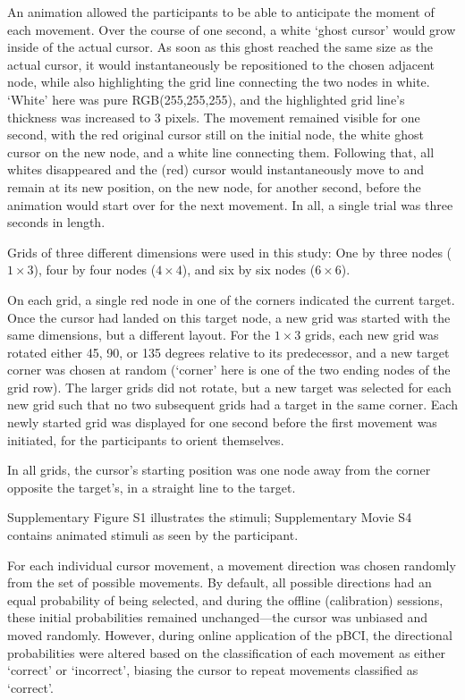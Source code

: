 An animation allowed the participants to be able to anticipate the moment of each movement. Over the course of one second, a white `ghost cursor' would grow inside of the actual cursor. As soon as this ghost reached the same size as the actual cursor, it would instantaneously be repositioned to the chosen adjacent node, while also highlighting the grid line connecting the two nodes in white. `White' here was pure \textsc{RGB}(255,255,255), and the highlighted grid line's thickness was increased to 3 pixels. The movement remained visible for one second, with the red original cursor still on the initial node, the white ghost cursor on the new node, and a white line connecting them. Following that, all whites disappeared and the (red) cursor would instantaneously move to and remain at its new position, on the new node, for another second, before the animation would start over for the next movement. In all, a single trial was three seconds in length.

Grids of three different dimensions were used in this study: One by three nodes ($1\times3$), four by four nodes ($4\times4$), and six by six nodes ($6\times6$).

On each grid, a single red node in one of the corners indicated the current target. Once the cursor had landed on this target node, a new grid was started with the same dimensions, but a different layout. For the $1\times3$ grids, each new grid was rotated either 45, 90, or 135 degrees relative to its predecessor, and a new target corner was chosen at random (`corner' here is one of the two ending nodes of the grid row). The larger grids did not rotate, but a new target was selected for each new grid such that no two subsequent grids had a target in the same corner. Each newly started grid was displayed for one second before the first movement was initiated, for the participants to orient themselves.

In all grids, the cursor's starting position was one node away from the corner opposite the target's, in a straight line to the target. 

Supplementary Figure S1 illustrates the stimuli; Supplementary Movie S4 contains animated stimuli as seen by the participant.

For each individual cursor movement, a movement direction was chosen randomly from the set of possible movements. By default, all possible directions had an equal probability of being selected, and during the offline (calibration) sessions, these initial probabilities remained unchanged---the cursor was unbiased and moved randomly. However, during online application of the pBCI, the directional probabilities were altered based on the classification of each movement as either `correct' or `incorrect', biasing the cursor to repeat movements classified as `correct'.

